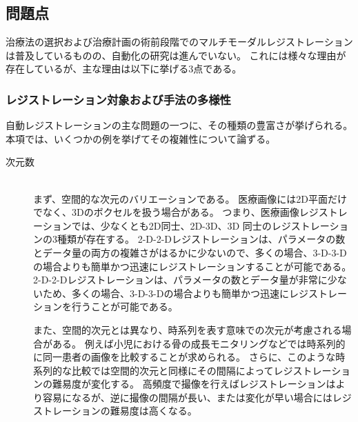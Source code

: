 \subsection{問題点}
    治療法の選択および治療計画の術前段階でのマルチモーダルレジストレーションは普及しているものの、自動化の研究は進んでいない。
    これには様々な理由が存在しているが、主な理由は以下に挙げる3点である。

    \subsubsection{レジストレーション対象および手法の多様性}
        自動レジストレーションの主な問題の一つに、その種類の豊富さが挙げられる。
        本項では、いくつかの例を挙げてその複雑性について論ずる。
    \begin{description}
        \item[次元数]\mbox{}\\
            まず、空間的な次元のバリエーションである。
            医療画像には2D平面だけでなく、3Dのボクセルを扱う場合がある。
            つまり、医療画像レジストレーションでは、少なくとも2D同士、2D-3D、3D 同士のレジストレーションの3種類が存在する。
            2-D-2-Dレジストレーションは、パラメータの数とデータ量の両方の複雑さがはるかに少ないので、多くの場合、3-D-3-Dの場合よりも簡単かつ迅速にレジストレーションすることが可能である。
            2-D-2-Dレジストレーションは、パラメータの数とデータ量が非常に少ないため、多くの場合、3-D-3-Dの場合よりも簡単かつ迅速にレジストレーションを行うことが可能である。
    
            また、空間的次元とは異なり、時系列を表す意味での次元が考慮される場合がある。
            例えば小児における骨の成長モニタリング\cite{saeed1998magnetic}などでは時系列的に同一患者の画像を比較することが求められる。
            さらに、このような時系列的な比較では空間的次元と同様にその間隔によってレジストレーションの難易度が変化する。
            高頻度で撮像を行えばレジストレーションはより容易になるが、逆に撮像の間隔が長い、または変化が早い場合にはレジストレーションの難易度は高くなる。
            


\end{description}
